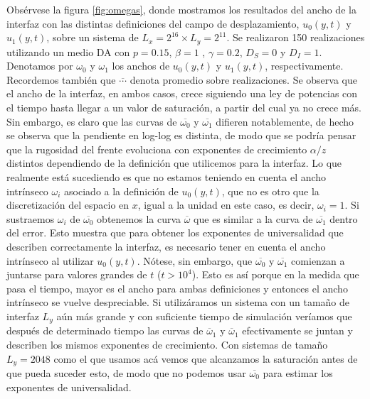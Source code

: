Obsérvese la figura \ref{fig:omegas}, donde mostramos los resultados del ancho de la interfaz con las distintas definiciones del campo de desplazamiento, $u_0(y,t)$ y $u_1(y,t)$, sobre un sistema de $L_x = 2^{16} \times L_y = 2^{11}$. Se realizaron 150 realizaciones utilizando un medio DA con $p=0.15$, $\beta = 1$ , $\gamma = 0.2$, $D_S = 0$ y $D_I=1$. Denotamos por $\omega_0$ y $\omega_1$ los anchos de $u_0(y,t)$ y $u_1(y,t)$, respectivamente. Recordemos también que $\overline{\cdots}$ denota promedio sobre realizaciones. Se observa que el ancho de la interfaz, en ambos casos, crece siguiendo una ley de potencias con el tiempo hasta llegar a un valor de saturación, a partir del cual ya no crece más. Sin embargo, es claro que las curvas de $\overline{\omega_0}$ y $\overline{\omega_1}$ difieren notablemente, de hecho se observa que la pendiente en log-log es distinta, de modo que se podría pensar que la rugosidad del frente evoluciona con exponentes de crecimiento $\alpha/z$ distintos dependiendo de la definición que utilicemos para la interfaz. Lo que realmente está sucediendo es que no estamos teniendo en cuenta el ancho intrínseco $\omega_i$ \cite{barabasi,kertesz1988noise,wolf1987surface} asociado a la definición de $u_0(y,t)$, que no es otro que la discretización del espacio en $x$, igual a la unidad en este caso, es decir, $\omega_i = 1$. Si sustraemos $\omega_i$ de $\overline{\omega_0}$ obtenemos la curva $\overline{\omega}$ que es similar a la curva de $\overline{\omega_1}$ dentro del error. Esto muestra que para obtener los exponentes de universalidad que describen correctamente la interfaz, es necesario tener en cuenta el ancho intrínseco al utilizar $u_0(y,t)$. Nótese, sin embargo, que $\overline{\omega_0}$ y $\overline{\omega_1}$ comienzan a juntarse para valores grandes de $t$ ($t>10^4$). Esto es así porque en la medida que pasa el tiempo, mayor es el ancho para ambas definiciones y entonces el ancho intrínseco se vuelve despreciable. Si utilizáramos un sistema con un tamaño de interfaz $L_y$ aún más grande y con suficiente tiempo de simulación veríamos que después de determinado tiempo las curvas de $\overline{\omega}_1$ y $\overline{\omega}_1$  efectivamente se juntan y describen los mismos exponentes de crecimiento. Con sistemas de tamaño $L_y = 2048$ como el que usamos acá vemos que alcanzamos la saturación antes de que pueda suceder esto, de modo que no podemos usar $\overline{\omega_0}$ para estimar los exponentes de universalidad.

